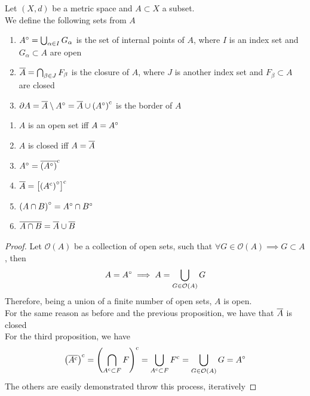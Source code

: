 \documentclass[../complete.tex]{subfiles}
\begin{document}
\begin{dfn}
	Let $(X,d)$ be a metric space and $A\subset X$ a subset.\\
	We define the following sets from $A$
	\begin{enumerate}
	\item $A^{\circ}=\bigcup_{\alpha\in I}G_\alpha$ is the set of internal points of $A$, where $I$ is an index set and $G_{\alpha}\subset A$ are open
	\item $\overline{A}=\bigcap_{\beta\in J}F_\beta$ is the closure of $A$, where $J$ is another index set and $F_\beta\subset A$ are closed
	\item $\partial{A}=\overline{A}\setminus A^{\circ}=\overline{A}\cup\left(A^{\circ}\right)^{\mathrm{c}}$ is the border of $A$
	\end{enumerate}
\end{dfn}
\begin{prop}
	\begin{enumerate}
	\item $A$ is an open set iff $A=A^{\circ}$
	\item $A$ is closed iff $A=\overline{A}$
	\item $A^{\circ}=\overline{\left( A^{\circ} \right)}^{\mathrm{c}}$
	\item $\overline{A}=\left[ \left( A^{\mathrm{c}} \right)^{\circ} \right]^{\mathrm{c}}$
	\item $\left( A\cap B \right)^{\circ}=A^{\circ}\cap B^{\circ}$
	\item $\overline{A\cap B}=\overline{A}\cup\overline{B}$
	\end{enumerate}
\end{prop}
\begin{proof}
	Let $\mathcal{O}(A)$ be a collection of open sets, such that $\forall{G}\in\mathcal{O}(A)\implies{} G\subset A$, then
	\begin{equation*}
		A=A^{\circ}\implies{} A=\bigcup_{G\in\mathcal{O}(A)}G
	\end{equation*}
	Therefore, being a union of a finite number of open sets, $A$ is open.\\
	For the same reason as before and the previous proposition, we have that $\overline{A}$ is closed\\
	For the third proposition, we have
	\begin{equation*}
		\left( \overline{A^{\mathrm{c}}} \right)^{\mathrm{c}}=\left( \bigcap_{A^{\mathrm{c}}\subset F}F \right)^{\mathrm{c}}=\bigcup_{A^{\mathrm{c}}\subset F}F^{\mathrm{c}}=\bigcup_{G\in\mathcal{O}(A)}G=A^{\circ}
	\end{equation*}
	The others are easily demonstrated throw this process, iteratively
\end{proof}
\end{document}
